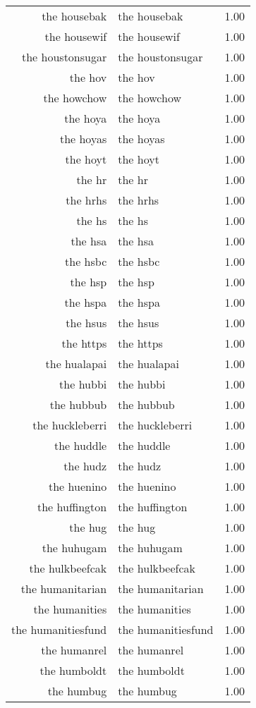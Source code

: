 \begin{table}[ht]
\begin{tabular}{rlr}
  the housebak & the housebak & 1.00 \\ 
  the housewif & the housewif & 1.00 \\ 
  the houstonsugar & the houstonsugar & 1.00 \\ 
  the hov & the hov & 1.00 \\ 
  the howchow & the howchow & 1.00 \\ 
  the hoya & the hoya & 1.00 \\ 
  the hoyas & the hoyas & 1.00 \\ 
  the hoyt & the hoyt & 1.00 \\ 
  the hr & the hr & 1.00 \\ 
  the hrhs & the hrhs & 1.00 \\ 
  the hs & the hs & 1.00 \\ 
  the hsa & the hsa & 1.00 \\ 
  the hsbc & the hsbc & 1.00 \\ 
  the hsp & the hsp & 1.00 \\ 
  the hspa & the hspa & 1.00 \\ 
  the hsus & the hsus & 1.00 \\ 
  the https & the https & 1.00 \\ 
  the hualapai & the hualapai & 1.00 \\ 
  the hubbi & the hubbi & 1.00 \\ 
  the hubbub & the hubbub & 1.00 \\ 
  the huckleberri & the huckleberri & 1.00 \\ 
  the huddle & the huddle & 1.00 \\ 
  the hudz & the hudz & 1.00 \\ 
  the huenino & the huenino & 1.00 \\ 
  the huffington & the huffington & 1.00 \\ 
  the hug & the hug & 1.00 \\ 
  the huhugam & the huhugam & 1.00 \\ 
  the hulkbeefcak & the hulkbeefcak & 1.00 \\ 
  the humanitarian & the humanitarian & 1.00 \\ 
  the humanities & the humanities & 1.00 \\ 
  the humanitiesfund & the humanitiesfund & 1.00 \\ 
  the humanrel & the humanrel & 1.00 \\ 
  the humboldt & the humboldt & 1.00 \\ 
  the humbug & the humbug & 1.00 \\ 

\end{tabular}
\end{table}
